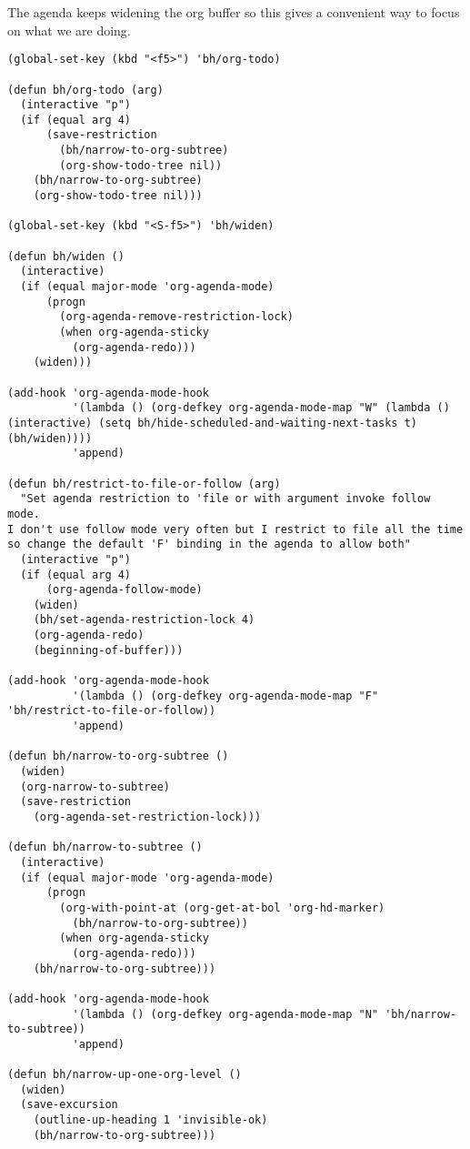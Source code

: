 \documentclass[11pt]{scrartcl}
\begin{document}
The agenda keeps widening the org buffer so this gives a convenient
way to focus on what we are doing.

\begin{verbatim}
(global-set-key (kbd "<f5>") 'bh/org-todo)

(defun bh/org-todo (arg)
  (interactive "p")
  (if (equal arg 4)
      (save-restriction
        (bh/narrow-to-org-subtree)
        (org-show-todo-tree nil))
    (bh/narrow-to-org-subtree)
    (org-show-todo-tree nil)))

(global-set-key (kbd "<S-f5>") 'bh/widen)

(defun bh/widen ()
  (interactive)
  (if (equal major-mode 'org-agenda-mode)
      (progn
        (org-agenda-remove-restriction-lock)
        (when org-agenda-sticky
          (org-agenda-redo)))
    (widen)))

(add-hook 'org-agenda-mode-hook
          '(lambda () (org-defkey org-agenda-mode-map "W" (lambda () (interactive) (setq bh/hide-scheduled-and-waiting-next-tasks t) (bh/widen))))
          'append)

(defun bh/restrict-to-file-or-follow (arg)
  "Set agenda restriction to 'file or with argument invoke follow mode.
I don't use follow mode very often but I restrict to file all the time
so change the default 'F' binding in the agenda to allow both"
  (interactive "p")
  (if (equal arg 4)
      (org-agenda-follow-mode)
    (widen)
    (bh/set-agenda-restriction-lock 4)
    (org-agenda-redo)
    (beginning-of-buffer)))

(add-hook 'org-agenda-mode-hook
          '(lambda () (org-defkey org-agenda-mode-map "F" 'bh/restrict-to-file-or-follow))
          'append)

(defun bh/narrow-to-org-subtree ()
  (widen)
  (org-narrow-to-subtree)
  (save-restriction
    (org-agenda-set-restriction-lock)))

(defun bh/narrow-to-subtree ()
  (interactive)
  (if (equal major-mode 'org-agenda-mode)
      (progn
        (org-with-point-at (org-get-at-bol 'org-hd-marker)
          (bh/narrow-to-org-subtree))
        (when org-agenda-sticky
          (org-agenda-redo)))
    (bh/narrow-to-org-subtree)))

(add-hook 'org-agenda-mode-hook
          '(lambda () (org-defkey org-agenda-mode-map "N" 'bh/narrow-to-subtree))
          'append)

(defun bh/narrow-up-one-org-level ()
  (widen)
  (save-excursion
    (outline-up-heading 1 'invisible-ok)
    (bh/narrow-to-org-subtree)))


\end{verbatim}
\end{document}
